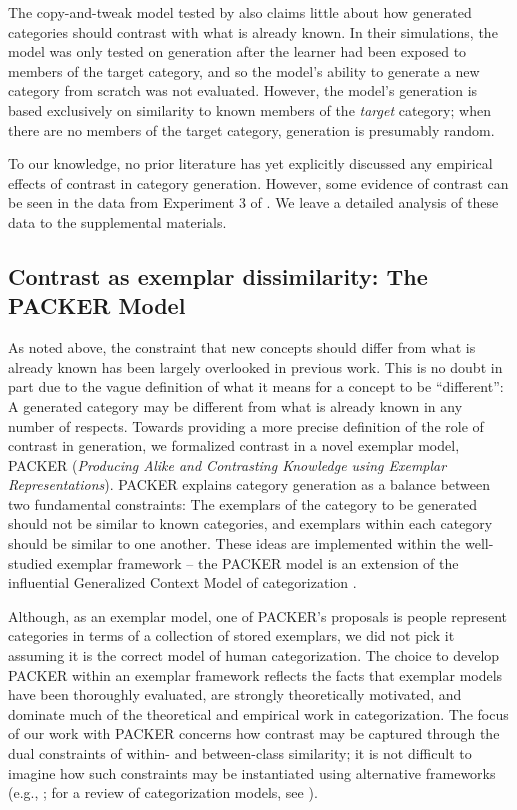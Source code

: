\documentclass[pdflatex,sn-apa]{sn-jnl}%
\theoremstyle{thmstyleone}%
\theoremstyle{thmstyletwo}%
\theoremstyle{thmstylethree}%
\begin{document}
The copy-and-tweak model tested by \cite{jern2013probabilistic} also claims
little about how generated categories should contrast with what is already
known. In their simulations, the model was only tested on generation after the
learner had been exposed to members of the target category, and so the model's
ability to generate a new category from scratch was not evaluated. However, the
model's generation is based exclusively on similarity to known members of the
{\em target} category; when there are no members of the target category,
generation is presumably random.

To our knowledge, no prior literature has yet explicitly discussed any empirical
effects of contrast in category generation. However, some evidence of contrast
can be seen in the data from Experiment 3 of \cite{jern2013probabilistic}. We
leave a detailed analysis of these data to the supplemental materials.

\subsection{Contrast as exemplar dissimilarity: The PACKER Model}

\label{section:PACKER-definition}

As noted above, the constraint that new concepts should differ from what is
already known has been largely overlooked in previous work. This is no doubt in
part due to the vague definition of what it means for a concept to be
``different'': A generated category may be different from what is already known
in any number of respects. Towards providing a more precise definition of the
role of contrast in generation, we formalized contrast in a novel exemplar
model, PACKER ({\em Producing Alike and Contrasting Knowledge using Exemplar
  Representations}). PACKER explains category generation as a balance between
two fundamental constraints: The exemplars of the category to be generated
should not be similar to known categories, and exemplars within each category
should be similar to one another. These ideas are implemented within the
well-studied exemplar framework -- the PACKER model is an extension of the
influential Generalized Context Model of categorization
\citep[GCM;][]{nosofsky1984choice,nosofsky1986attention}.

Although, as an exemplar model, one of PACKER's proposals is people represent
categories in terms of a collection of stored exemplars, we did not pick it
assuming it is the correct model of human categorization. The choice to develop
PACKER within an exemplar framework reflects the facts that exemplar models have
been thoroughly evaluated, are strongly theoretically motivated, and dominate
much of the theoretical and empirical work in categorization. The focus of our
work with PACKER concerns how contrast may be captured through the dual constraints of within- and between-class
similarity; it is not difficult to imagine how such constraints may be
instantiated using alternative frameworks (e.g.,
\citealp{kurtz2007divergent,love2004sustain,smith2000thirty}; for a review of
categorization models, see \citealp{pothoswills2011}).
\end{document}
